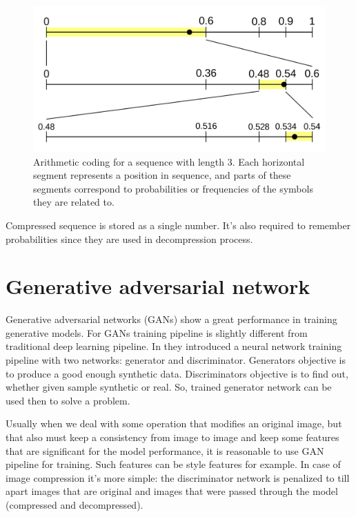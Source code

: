\begin{figure}[!ht]
    \centering
    \includegraphics[width=\textwidth]{figure/Arithmetic_encoding.svg.png}
    \caption{Arithmetic coding for a sequence with length 3. Each horizontal segment represents a position in sequence, and parts of these segments correspond to probabilities or frequencies of the symbols they are related to.}
    \label{arithmetic_coding}
\end{figure}

Compressed sequence is stored as a single number. It's also required to remember probabilities since they are used in decompression process.

\section{Generative adversarial network}

Generative adversarial networks (GANs) show a great performance in training generative models. For GANs training pipeline is slightly different from traditional deep learning pipeline. In \cite{Goodfellow_Pouget-Abadie_Mirza_Xu_Warde-Farley_Ozair_Courville_Bengio_2014} they introduced a neural network training pipeline with two networks: generator and discriminator. Generators objective is to produce a good enough synthetic data. Discriminators objective is to find out, whether given sample synthetic or real. So, trained generator network can be used then to solve a problem.

Usually when we deal with some operation that modifies an original image, but that also must keep a consistency from image to image and keep some features that are significant for the model performance, it is reasonable to use GAN pipeline for training. Such features can be style features for example. In case of image compression it's more simple: the discriminator network is penalized to till apart images that are original and images that were passed through the model (compressed and decompressed).

